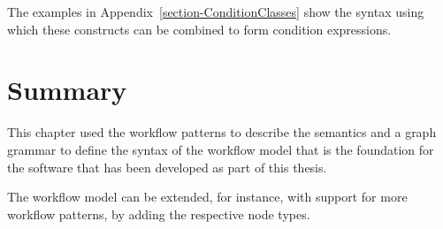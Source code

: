 The examples in Appendix~\ref{section-ConditionClasses} show the syntax using
which these constructs can be combined to form condition expressions.

\section{Summary}

This chapter used the workflow patterns to describe the semantics and a graph
grammar to define the syntax of the workflow model that is the foundation for
the software that has been developed as part of this thesis.

The workflow model can be extended, for instance, with support for more
workflow patterns, by adding the respective node types.
